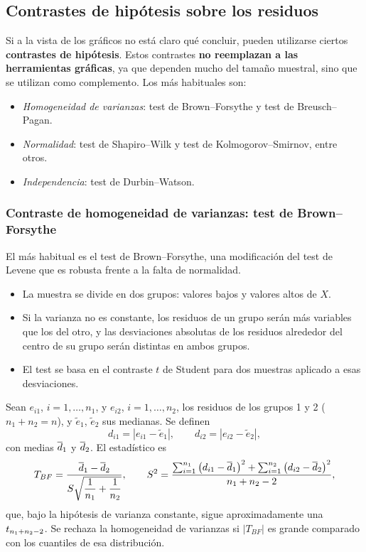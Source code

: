 \subsection{Contrastes de hipótesis sobre los residuos}

Si a la vista de los gráficos no está claro qué concluir, pueden utilizarse ciertos
\textbf{contrastes de hipótesis}. Estos contrastes \textbf{no reemplazan a las herramientas
gráficas}, ya que dependen mucho del tamaño muestral, sino que se utilizan como complemento. Los
más habituales son:
\begin{itemize}
  \item \emph{Homogeneidad de varianzas}: test de Brown--Forsythe y test de Breusch--Pagan.
  \item \emph{Normalidad}: test de Shapiro--Wilk y test de Kolmogorov--Smirnov, entre otros.
  \item \emph{Independencia}: test de Durbin--Watson.
\end{itemize}

\subsubsection{Contraste de homogeneidad de varianzas: test de Brown--Forsythe}

El más habitual es el test de Brown--Forsythe, una modificación del test de Levene que es robusta
frente a la falta de normalidad.
\begin{itemize}
  \item La muestra se divide en dos grupos: valores bajos y valores altos de $X$.
  \item Si la varianza no es constante, los residuos de un grupo serán más variables que los del
    otro, y las desviaciones absolutas de los residuos alrededor del centro de su grupo serán
    distintas en ambos grupos.
  \item El test se basa en el contraste $t$ de Student para dos muestras aplicado a esas
    desviaciones.
\end{itemize}
Sean $e_{i1}$, $i=1,\ldots,n_1$, y $e_{i2}$, $i=1,\ldots,n_2$, los residuos de los grupos 1 y 2
($n_1+n_2=n$), y $\tilde e_1$, $\tilde e_2$ sus medianas. Se definen
\[
  d_{i1} = |e_{i1}-\tilde e_1|, \qquad d_{i2} = |e_{i2}-\tilde e_2| ,
\]
con medias $\overline{d}_1$ y $\overline{d}_2$. El estadístico es
\[
  T_{BF} = \frac{\overline{d}_1-\overline{d}_2}{S\sqrt{\dfrac{1}{n_1}+\dfrac{1}{n_2}}},
  \qquad
  S^2 = \frac{\sum_{i=1}^{n_1}\big(d_{i1}-\overline{d}_1\big)^2+\sum_{i=1}^{n_2}\big(d_{i2}-\overline{d}_2\big)^2}{n_1+n_2-2},
\]
que, bajo la hipótesis de varianza constante, sigue aproximadamente una $t_{n_1+n_2-2}$. Se
rechaza la homogeneidad de varianzas si $|T_{BF}|$ es grande comparado con los cuantiles de esa
distribución.

